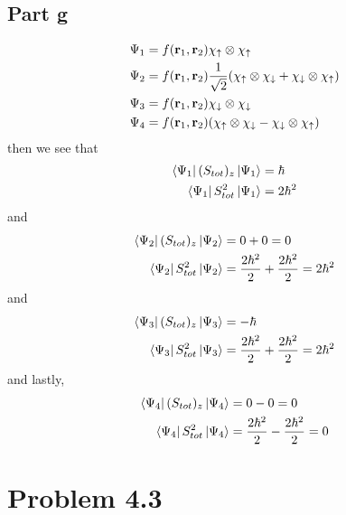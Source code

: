 \documentclass[12pt]{report}
\theoremstyle{custom}
\newcommand{\rb}{\bold{r}}
\begin{document}
\subsection*{Part g}
\begin{align*}
    \Psi_1 &= f(\rb_1,\rb_2) \chi_{\uparrow} \otimes \chi_{\uparrow} \\
    \Psi_2 &= f(\rb_1,\rb_2) \frac{1}{\sqrt{2}}(\chi_{\uparrow} \otimes \chi_{\downarrow} + \chi_{\downarrow} \otimes \chi_{\uparrow}) \\
    \Psi_3 &= f(\rb_1,\rb_2) \chi_{\downarrow} \otimes \chi_{\downarrow} \\
    \Psi_4 &= f(\rb_1,\rb_2) (\chi_{\uparrow} \otimes \chi_{\downarrow} - \chi_{\downarrow} \otimes \chi_{\uparrow}) \\
\end{align*}
then we see that
\begin{align*}
    \bra{\Psi_1}(S_{tot})_z\ket{\Psi_1} &= \hbar \\
    \bra{\Psi_1}S_{tot}^2\ket{\Psi_1} &= 2\hbar^2
\end{align*}
and
\begin{align*}
    \bra{\Psi_2}(S_{tot})_z\ket{\Psi_2} &= 0 + 0 = 0 \\
    \bra{\Psi_2}S_{tot}^2\ket{\Psi_2} &= \frac{2\hbar^2}{2} + \frac{2\hbar^2}{2} = 2\hbar^2
\end{align*}
and
\begin{align*}
    \bra{\Psi_3}(S_{tot})_z\ket{\Psi_3} &= -\hbar \\
    \bra{\Psi_3}S_{tot}^2\ket{\Psi_3} &= \frac{2\hbar^2}{2} + \frac{2\hbar^2}{2} = 2\hbar^2
\end{align*}
and lastly,
\begin{align*}
    \bra{\Psi_4}(S_{tot})_z\ket{\Psi_4} &= 0 - 0 = 0 \\
    \bra{\Psi_4}S_{tot}^2\ket{\Psi_4} &= \frac{2\hbar^2}{2} - \frac{2\hbar^2}{2} = 0
\end{align*}
\section*{Problem 4.3}
\end{document}
